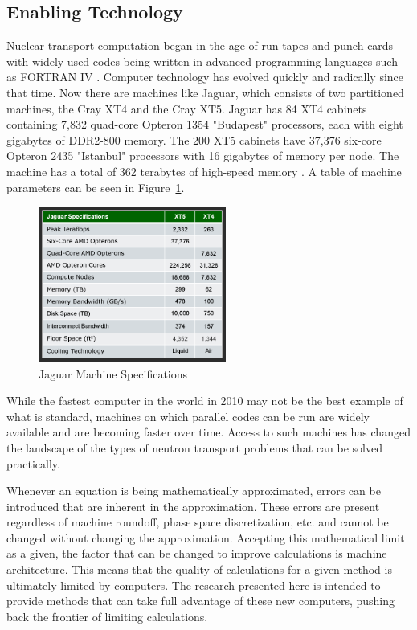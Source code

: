 \subsection{Enabling Technology}
Nuclear transport computation began in the age of run tapes and punch cards with widely used codes being written in advanced programming languages such as FORTRAN IV \cite{Fortran1998}. Computer technology has evolved quickly and radically since that time. Now there are machines like Jaguar, which consists of two partitioned machines, the Cray XT4 and the Cray XT5. Jaguar has 84 XT4 cabinets containing 7,832 quad-core Opteron 1354 "Budapest" processors, each with eight gigabytes of DDR2-800 memory. The 200 XT5 cabinets have 37,376 six-core Opteron 2435 "Istanbul" processors with 16 gigabytes of memory per node. The machine has a total of 362 terabytes of high-speed memory \cite{Sciences2010}. A table of machine parameters can be seen in Figure~\ref{fig:jaguar}. 

\begin{figure}[!h]
  \begin{center}
    \includegraphics [width=0.55\textwidth, height=0.35\textheight ] {jaguarSpecs09}
  \end{center}
  \caption{Jaguar Machine Specifications \cite{Sciences2010}}
  \label{fig:jaguar}
\end{figure}

While the fastest computer in the world in 2010 may not be the best example of what is standard, machines on which parallel codes can be run are widely available and are becoming faster over time. Access to such machines has changed the landscape of the types of neutron transport problems that can be solved practically. 

Whenever an equation is being mathematically approximated, errors can be introduced that are inherent in the approximation. These errors are present regardless of machine roundoff, phase space discretization, etc. and cannot be changed without changing the approximation. Accepting this mathematical limit as a given, the factor that can be changed to improve calculations is machine architecture. This means that the quality of calculations for a given method is ultimately limited by computers. The research presented here is intended to provide methods that can take full advantage of these new computers, pushing back the frontier of limiting calculations.

